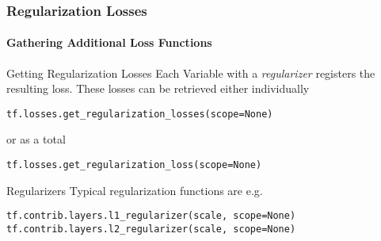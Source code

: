 \begin{frame}[fragile]
    \frametitle{Regularization Losses}
    \framesubtitle{Gathering Additional Loss Functions}
    \begin{block}{Getting Regularization Losses}
        Each Variable with a \emph{regularizer} registers the resulting loss. These losses can be retrieved either 
    individually 
    \begin{lstlisting}
tf.losses.get_regularization_losses(scope=None)
    \end{lstlisting}
    or as a total
    \begin{lstlisting}
tf.losses.get_regularization_loss(scope=None)
    \end{lstlisting}
    \end{block}
     
    \begin{block}{Regularizers}
        Typical regularization functions are e.g.
    \begin{lstlisting}
tf.contrib.layers.l1_regularizer(scale, scope=None)
tf.contrib.layers.l2_regularizer(scale, scope=None)
    \end{lstlisting}  
    \end{block}
\end{frame}

